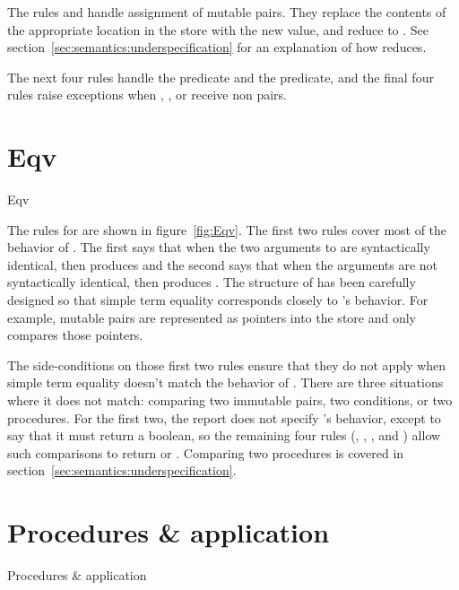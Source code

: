 The rules  and  handle assignment of mutable pairs. 
They replace the contents of the appropriate location in the store with the new value, and reduce to . See section~\ref{sec:semantics:underspecification} for an explanation of how  reduces.

The next four rules handle the  predicate and the  predicate, and the final four rules raise exceptions when , ,  or  receive non pairs.

\section{Eqv}

\beginfig
\begin{center}

\end{center}
\caption{Eqv}\label{fig:Eqv}
\endfig

The rules for  are shown in figure~\ref{fig:Eqv}. The first two rules cover most of the behavior of . 
The first says that when the two arguments to  are syntactically identical, then  produces \semtrue{} and the second says that when the arguments are not syntactically identical, then  produces \semfalse{}. 
The structure of  has been carefully designed so that simple term equality corresponds closely to 's behavior. 
For example, mutable pairs are represented as pointers into the store and  only compares those pointers.

The side-conditions on those first two rules ensure that they do not apply when simple term equality doesn't match the behavior of . There are three situations where it does not match: comparing two immutable pairs, two conditions, or two procedures. For the first two, the report does not specify 's behavior, except to say that it must return a boolean, so the remaining four rules (, , , and ) allow such comparisons to return \semtrue{} or \semfalse{}. Comparing two procedures is covered in section~\ref{sec:semantics:underspecification}. 

\section{Procedures \& application}

\subfigurestart{}
\beginfig
\begin{center}

\end{center}
\caption{Procedures \& application}\label{fig:Procedure--application}
\endfig

